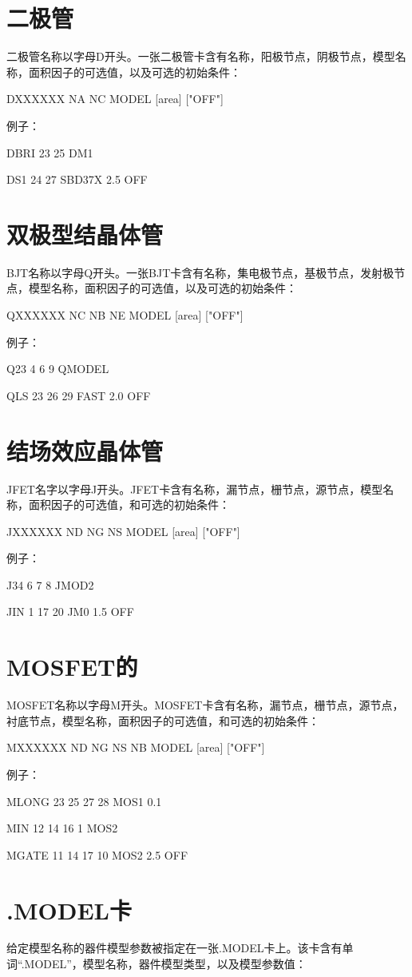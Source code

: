 \section{二极管}
二极管名称以字母D开头。一张二极管卡含有名称，阳极节点，阴极节点，模型名称，面积因子的可选值，以及可选的初始条件：

DXXXXXX NA NC MODEL [area] ["OFF"]

例子：

DBRI 23 25 DM1

DS1 24 27 SBD37X 2.5 OFF

\section{双极型结晶体管}
BJT名称以字母Q开头。一张BJT卡含有名称，集电极节点，基极节点，发射极节点，模型名称，面积因子的可选值，以及可选的初始条件：

QXXXXXX NC NB NE MODEL [area] ["OFF"]

例子：

Q23 4 6 9 QMODEL

QLS 23 26 29 FAST 2.0 OFF

\section{结场效应晶体管}
JFET名字以字母J开头。JFET卡含有名称，漏节点，栅节点，源节点，模型名称，面积因子的可选值，和可选的初始条件：

JXXXXXX ND NG NS MODEL [area] ["OFF"]

例子：

J34 6 7 8 JMOD2

JIN 1 17 20 JM0 1.5 OFF

\section{MOSFET的}
MOSFET名称以字母M开头。MOSFET卡含有名称，漏节点，栅节点，源节点，衬底节点，模型名称，面积因子的可选值，和可选的初始条件：

MXXXXXX ND NG NS NB MODEL [area] ["OFF"]

例子：

MLONG 23 25 27 28 MOS1 0.1

MIN 12 14 16 1 MOS2

MGATE 11 14 17 10 MOS2 2.5 OFF

\section{.MODEL卡}
给定模型名称的器件模型参数被指定在一张.MODEL卡上。该卡含有单词“.MODEL”，模型名称，器件模型类型，以及模型参数值：

